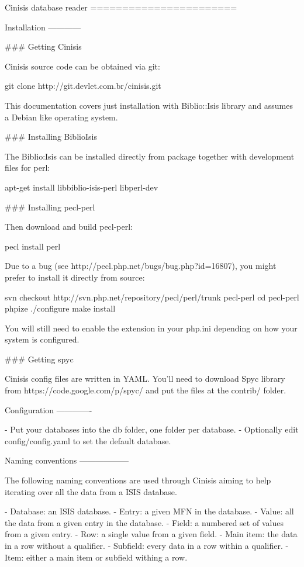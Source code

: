\begin{DoxyVerbInclude}
Cinisis database reader
=======================

Installation
------------

### Getting Cinisis

Cinisis source code can be obtained via git:

    git clone http://git.devlet.com.br/cinisis.git

This documentation covers just installation with Biblio::Isis library
and assumes a Debian like operating system.

### Installing BiblioIsis

The Biblio:Isis can be installed directly from package together with
development files for perl:

    apt-get install libbiblio-isis-perl libperl-dev

### Installing pecl-perl

Then download and build pecl-perl:

    pecl install perl

Due to a bug (see http://pecl.php.net/bugs/bug.php?id=16807), you might
prefer to install it directly from source:

    svn checkout http://svn.php.net/repository/pecl/perl/trunk pecl-perl
    cd pecl-perl
    phpize
    ./configure
    make install

You will still need to enable the extension in your php.ini depending on
how your system is configured.

### Getting spyc

Cinisis config files are written in YAML. You'll need to download Spyc
library from https://code.google.com/p/spyc/ and put the files at
the contrib/ folder.

Configuration
-------------

  - Put your databases into the db folder, one folder per database.
  - Optionally edit config/config.yaml to set the default database.

Naming conventions
------------------

The following naming conventions are used through Cinisis aiming to help
iterating over all the data from a ISIS database.

  - Database:  an ISIS database.
  - Entry:     a given MFN in the database.
  - Value:     all the data from a given entry in the database.
  - Field:     a numbered set of values from a given entry.
  - Row:       a single value from a given field.
  - Main item: the data in a row without a qualifier.
  - Subfield:  every data in a row within a qualifier.
  - Item:      either a main item or subfield withing a row.


\end{DoxyVerbInclude}

